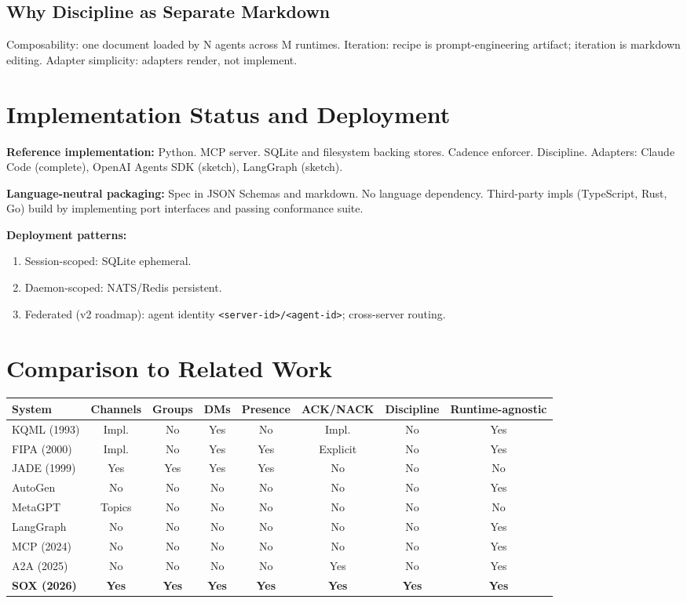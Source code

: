\documentclass[11pt]{article}
\begin{document}
\subsection{Why Discipline as Separate Markdown}

Composability: one document loaded by N agents across M runtimes. Iteration: recipe is prompt-engineering artifact; iteration is markdown editing. Adapter simplicity: adapters render, not implement.

\section{Implementation Status and Deployment}

\textbf{Reference implementation:} Python. MCP server. SQLite and filesystem backing stores. Cadence enforcer. Discipline. Adapters: Claude Code (complete), OpenAI Agents SDK (sketch), LangGraph (sketch).

\textbf{Language-neutral packaging:} Spec in JSON Schemas and markdown. No language dependency. Third-party impls (TypeScript, Rust, Go) build by implementing port interfaces and passing conformance suite.

\textbf{Deployment patterns:}
\begin{enumerate}
  \item Session-scoped: SQLite ephemeral.
  \item Daemon-scoped: NATS/Redis persistent.
  \item Federated (v2 roadmap): agent identity \texttt{<server-id>/<agent-id>}; cross-server routing.
\end{enumerate}

\section{Comparison to Related Work}

\begin{table}[h]
\centering
\begin{tabular}{lccccccc}
\toprule
System & Channels & Groups & DMs & Presence & ACK/NACK & Discipline & Runtime-agnostic \\
\midrule
KQML (1993) & Impl. & No & Yes & No & Impl. & No & Yes \\
FIPA (2000) & Impl. & No & Yes & Yes & Explicit & No & Yes \\
JADE (1999) & Yes & Yes & Yes & Yes & No & No & No \\
AutoGen & No & No & No & No & No & No & Yes \\
MetaGPT & Topics & No & No & No & No & No & No \\
LangGraph & No & No & No & No & No & No & Yes \\
MCP (2024) & No & No & No & No & No & No & Yes \\
A2A (2025) & No & No & No & No & Yes & No & Yes \\
\textbf{SOX (2026)} & \textbf{Yes} & \textbf{Yes} & \textbf{Yes} & \textbf{Yes} & \textbf{Yes} & \textbf{Yes} & \textbf{Yes} \\
\bottomrule
\end{tabular}
\end{table}
\end{document}

